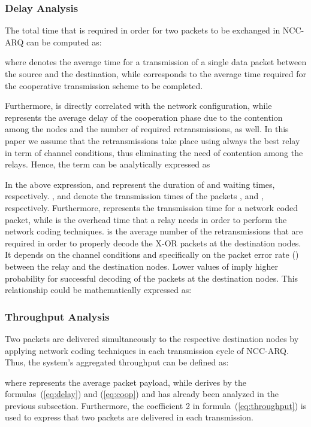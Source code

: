 \documentclass[conference]{IEEEtran}
\begin{document}
\subsubsection{Delay Analysis}

The total time that is required in order for two packets to be exchanged in NCC-ARQ can be computed as:


where  denotes the average time for a transmission of a single data packet between the source and the destination, while  corresponds to the average time required for the cooperative transmission scheme to be completed.

Furthermore,  is directly correlated with the network configuration, while  represents the average delay of the cooperation phase due to the contention among the nodes and the number of required retransmissions, as well. In this paper we assume that the retransmissions take place using always the best relay in term of channel conditions, thus eliminating the need of contention among the relays. Hence, the term   can be analytically expressed as
\footnotesize


\normalsize

In the above expression,  and  represent the duration of  and  waiting times, respectively. ,  and  denote the transmission times of the packets ,  and , respectively. Furthermore,  represents the transmission time for a network coded packet, while  is the overhead time that a relay needs in order to perform the network coding techniques.  is the average number of the retransmissions that are required in order to properly decode the X-OR packets at the destination nodes. It depends on the channel conditions and specifically on the packet error rate () between the relay and the destination nodes. Lower values of  imply higher probability for successful decoding of the packets at the destination nodes. This relationship could be mathematically expressed as:



\subsubsection{Throughput Analysis}

Two packets are delivered simultaneously to the respective destination nodes by applying network coding techniques in each transmission cycle of NCC-ARQ. Thus, the system's aggregated throughput can be defined as:



where  represents the average packet payload, while  derives by the formulas~(\ref{eq:delay}) and (\ref{eq:coop}) and has already been analyzed in the previous subsection. Furthermore, the coefficient 2 in formula~(\ref{eq:throughput}) is used to express that two packets are delivered in each transmission.
\end{document}
